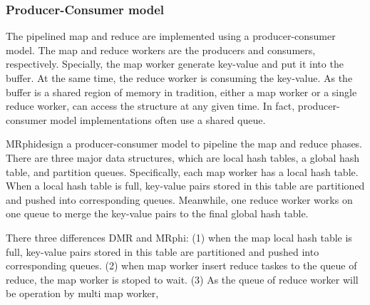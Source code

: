 


\subsubsection{Producer-Consumer model}
The pipelined map and reduce are implemented using a
producer-consumer model. 
The map and reduce workers are the producers and consumers, respectively.
Specially, the map worker generate key-value and 
put it into the buffer.
At the same time, 
the reduce worker is consuming the key-value.
As the buffer is a shared region of memory in tradition,
either a map worker or a single reduce worker,
can access the structure at any given time.
In fact, producer-consumer model implementations
often use a shared queue.

MRphi\cite{lu2013mrphi}design a producer-consumer model 
to pipeline the map and reduce phases. 
There are three major data structures, 
which are local hash tables, a global hash table, 
and partition queues. 
Specifically, each map worker has a local hash table. 
When a local hash table is full,
key-value pairs stored in this table are partitioned and
pushed into corresponding queues. 
Meanwhile, one reduce
worker works on one queue to merge the key-value pairs to
the final global hash table.

There three differences DMR and MRphi:
(1) when the map local hash table is full,
key-value pairs stored in this table are partitioned and
pushed into corresponding queues.
(2) when map worker insert reduce taskes to the queue of reduce,
the map worker is stoped to wait.
(3)%
As the queue of reduce worker will be operation by multi map worker,




